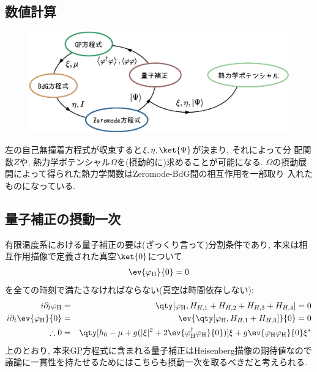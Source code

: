 \documentclass[10.5pt,a4paper]{jreport}
\begin{document}
\subsection{数値計算}
\begin{figure}[H]
  \begin{center}
    \includegraphics[width = 14cm]{./EPS/self-consistent_new2.eps}
  \end{center}
  \label{self-consistent}
\end{figure}

左の自己無撞着方程式が収束すると$\xi, \eta, \ket{\Psi}$が決まり, それによって分
配関数$Z$や, 熱力学ポテンシャル$\Omega$を(摂動的に)求めることが可能になる.
$\Omega$の摂動展開によって得られた熱力学関数はZeromode-BdG間の相互作用を一部取り
入れたものになっている.
\subsection{量子補正の摂動一次}
有限温度系における量子補正の要は(ざっくり言って)分割条件であり, 本来は相互作用描像で定義された真空$\ket{0}$について
\begin{eqnarray}
  \ev{\varphi_{\rm H}}{0} = 0
\end{eqnarray}
を全ての時刻で満たさなければならない(真空は時間依存しない):
\begin{eqnarray}
  i\partial_t \varphi_{\rm H} &=& \qty[\varphi_{\rm H}, H_{H, 1} + H_{H, 2} + H_{H, 3} + H_{H, 4} ] = 0\\
  i\partial_t \ev{\varphi_{\rm H}}{0} &=& \ev{\qty[\varphi_{\rm H}, H_{H, 1} +  H_{H, 3}] }{0} = 0\\
  \therefore 0 &=& \qty[h_0 - \mu +  g(|\xi|^2 + 2\ev{\varphi_{\rm H}^\dagger\varphi_{\rm H}}{0})]\xi + g\ev{\varphi_{\rm H}\varphi_{\rm H}}{0}\xi^*
\end{eqnarray}
上のとおり, 本来GP方程式に含まれる量子補正はHeisenberg描像の期待値なので議論に一貫性を持たせるためにはこちらも摂動一次を取るべきだと考えられる.
\end{document}
